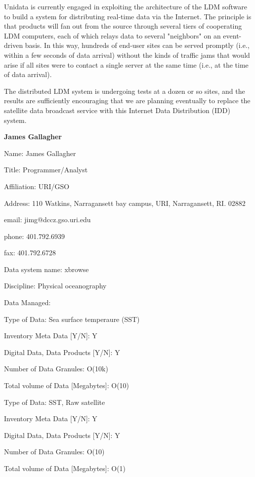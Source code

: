 	Unidata is currently engaged in exploiting the architecture of the 
LDM software to build a system for distributing real-time data via the 
Internet.  The principle is that products will fan out from the source 
through several tiers of cooperating LDM computers, each of which relays 
data to several "neighbors" on an event-driven basis.  In this way, 
hundreds of end-user sites can be served promptly (i.e., within a few 
seconds of data arrival) without the kinds of traffic jams that would 
arise if all sites were to contact a single server at the same time (i.e., at 
the time of data arrival).

	The distributed LDM system is undergoing tests at a dozen or so 
sites, and the results are sufficiently encouraging that we are planning 
eventually to replace the satellite data broadcast service with this 
Internet Data Distribution (IDD) system.
\newpage

\begin{center}
\LARGE
{\bf  James Gallagher}
\end{center}
\large
{}
\normalsize
\smallskip
\begin{description}
\item{Name:}  James Gallagher
\item{Title:}  Programmer/Analyst
\item{Affiliation:}  URI/GSO
\item{Address:}  110 Watkins, Narragansett bay campus, URI, 
Narragansett, RI. 02882
\item{email:}  jimg@dccz.gso.uri.edu
\item{phone:}  401.792.6939
\item{fax:}  401.792.6728
\end{description}
\medskip
\large
{}
\normalsize
\medskip
\begin{description}

\item{Data system name:}  xbrowse
\item{Discipline:}  Physical oceanography
\item{Data Managed:}
	\begin{description}
	\item{Type of Data:}  Sea surface temperaure (SST)
	\item{Inventory Meta Data [Y/N]:}  Y
	\item{Digital Data, Data Products [Y/N]:}  Y
	\item{Number of Data Granules:}  O(10k)
	\item{Total volume of Data [Megabytes]:}  O(10)
\medskip
	\item{Type of Data:}  SST, Raw satellite
	\item{Inventory Meta Data [Y/N]:}  Y
	\item{Digital Data, Data Products [Y/N]:}  Y
	\item{Number of Data Granules:}  O(10)
	\item{Total volume of Data [Megabytes]:}  O(1)
	\end{description}
\end{description}

